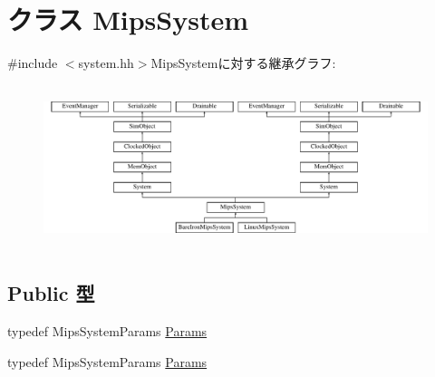 \hypertarget{classMipsSystem}{
\section{クラス MipsSystem}
\label{classMipsSystem}
}


{\ttfamily \#include $<$system.hh$>$}MipsSystemに対する継承グラフ:\begin{figure}[H]
\begin{center}
\leavevmode
\includegraphics[height=4.80392cm]{classMipsSystem}
\end{center}
\end{figure}
\subsection*{Public 型}
\begin{DoxyCompactItemize}
\item 
typedef MipsSystemParams \hyperlink{classMipsSystem_acf01be080284e8262bc1ff41fbd1710c}{Params}
\item 
typedef MipsSystemParams \hyperlink{classMipsSystem_acf01be080284e8262bc1ff41fbd1710c}{Params}
\end{DoxyCompactItemize}
